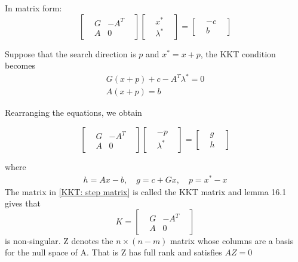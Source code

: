\documentclass[11pt]{article}
\begin{document}
    In matrix form:
    \[
        \begin{bmatrix}
            &G & -A^T& \\
            &A & 0&
        \end{bmatrix}
        \begin{bmatrix}
            &x^*&\\
            &\lambda^*&
        \end{bmatrix} =
        \begin{bmatrix}
            &-c&\\
            &b&
        \end{bmatrix}\tag{16.4} \label{KKT: original matrix}
    \]

    Suppose that the search direction is $p$ and $x^* = x + p $, the KKT condition becomes
    \begin{align*}
        G(x + p) + c - A^T\lambda^* = 0\\
        A(x + p) = b
    \end{align*}

    Rearranging the equations, we obtain

    \[
        \begin{bmatrix}
            &G & -A^T& \\
            &A & 0&
        \end{bmatrix}
        \begin{bmatrix}
            &-p&\\
            &\lambda^*&
        \end{bmatrix} =
        \begin{bmatrix}
            &g&\\
            &h&
        \end{bmatrix}\tag{16.5} \label{KKT: step matrix}
    \]

    where
    \begin{align}
        h = Ax -b,  \quad g = c + Gx, \quad p = x^* - x \tag{16.6}\label{KKT: transform}
    \end{align}
    The matrix in \eqref{KKT: step matrix} is called the KKT matrix and lemma 16.1 gives that
    \[
        K =
        \begin{bmatrix}
            &G & -A^T& \\
            &A & 0&
        \end{bmatrix}
    \]
    is non-singular.
    Z denotes the $n\times(n -m)$ matrix whose columns are a basis for the null space of A. That is
    Z has full rank and satisfies $AZ = 0$
\end{document}
